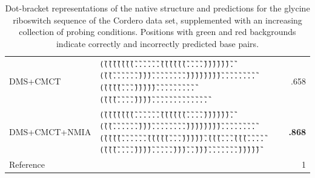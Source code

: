 \documentclass[a4,center,fleqn]{NAR}
\begin{document}
\begin{table}
\begin{adjustbox}{max width=\linewidth}
\begin{tabular}{@{}llr@{}}
			DMS+CMCT & {\tt \G{(}\G{(}\G{(}\G{(}\G{(}\G{(}\G{(}\G{(}\G{.}\G{.}\G{.}\G{.}\G{.}\G{.}\G{(}\G{(}\G{(}\G{(}\G{(}\G{(}\G{.}\G{.}\G{.}\G{.}\G{)}\G{)}\G{)}\G{)}\G{)}\G{)}\G{.}\G{(}\G{(}\G{(}\B{(}\B{(}\B{(}\B{(}\B{(}\B{.}\B{.}\G{.}\G{.}\G{.}\G{.}\B{)}\B{)}\B{)}\B{)}\B{)}\G{.}\G{.}\G{)}\G{)}\G{)}\G{.}\G{.}\G{.}\G{.}\G{.}\G{.}\G{.}\G{.}\G{)}\G{)}\G{)}\G{)}\G{)}\G{)}\G{)}\G{)}\G{.}\G{.}\G{.}\G{.}\G{.}\G{.}\G{.}\B{(}\B{(}\B{.}\B{.}\B{.}\B{.}\B{(}\B{(}\B{(}\B{(}\B{(}\G{.}\G{(}\G{(}\G{(}\G{(}\G{(}\B{(}\G{.}\G{.}\G{.}\B{)}\G{)}\G{)}\G{)}\G{)}\G{)}\G{.}\B{.}\B{.}\B{.}\G{.}\G{.}\G{.}\G{.}\B{.}\B{.}\B{.}\G{.}\G{.}\G{.}\G{.}\G{(}\G{(}\G{(}\G{(}\G{.}\G{.}\G{.}\G{.}\G{)}\G{)}\G{)}\G{)}\G{.}\G{.}\G{.}\G{.}\G{.}\B{)}\B{)}\B{)}\B{)}\B{)}\G{.}\B{)}\B{)}\B{.}\G{.}\G{.}\G{.}\G{.}\G{.}\G{.}\G{.}\B{.}\B{.}\B{.}\B{.}\B{.}}&.658\\
			DMS+CMCT+NMIA & {\tt \G{(}\G{(}\G{(}\G{(}\G{(}\G{(}\G{(}\G{(}\G{.}\G{.}\G{.}\G{.}\G{.}\G{.}\G{(}\G{(}\G{(}\G{(}\G{(}\G{(}\G{.}\G{.}\G{.}\G{.}\G{)}\G{)}\G{)}\G{)}\G{)}\G{)}\G{.}\G{(}\G{(}\G{(}\B{(}\B{(}\B{(}\B{(}\B{(}\B{.}\B{.}\G{.}\G{.}\G{.}\G{.}\B{)}\B{)}\B{)}\B{)}\B{)}\G{.}\G{.}\G{)}\G{)}\G{)}\G{.}\G{.}\G{.}\G{.}\G{.}\G{.}\G{.}\G{.}\G{)}\G{)}\G{)}\G{)}\G{)}\G{)}\G{)}\G{)}\G{.}\G{.}\G{.}\G{.}\G{.}\G{.}\G{.}\G{.}\G{(}\G{(}\G{(}\G{(}\G{(}\G{.}\G{.}\G{.}\G{.}\G{.}\G{.}\G{(}\G{(}\G{(}\G{(}\G{(}\B{(}\G{.}\G{.}\G{.}\B{)}\G{)}\G{)}\G{)}\G{)}\G{)}\G{.}\G{(}\G{(}\G{(}\G{.}\G{.}\G{.}\B{(}\G{(}\G{(}\G{(}\G{.}\G{.}\G{.}\G{.}\G{(}\G{(}\G{(}\G{(}\G{.}\G{.}\G{.}\G{.}\G{)}\G{)}\G{)}\G{)}\G{.}\G{.}\G{.}\G{.}\G{.}\G{)}\G{)}\G{)}\B{)}\G{.}\G{.}\G{)}\G{)}\G{)}\G{.}\G{.}\G{.}\G{.}\G{.}\G{.}\G{.}\G{)}\G{)}\G{)}\G{)}\G{)}} & \textbf{.868}\\ \midrule
			Reference& {\tt \Base{((((((((......((((((....)))))).(((....(((.....)))...)))........))))))))........(((((......(((((.....))))).(((....(((....((((....)))).....)))...))).......)))))}}& 1\\
			\bottomrule
		\end{tabular}
	\end{adjustbox}\\
	\caption{Dot-bracket representations of the native structure and \OurTool{} predictions for the glycine riboswitch sequence of the Cordero\etal\cite{Cordero2012} data set, supplemented with an increasing collection of probing conditions. Positions with green and red backgrounds indicate correctly and incorrectly predicted base pairs.}\label{fig:glycine_example}
\end{table}
\end{document}
